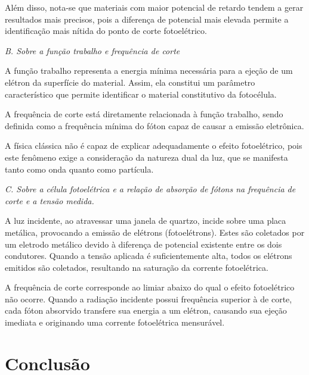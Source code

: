 \documentclass[10pt,twocolumn,letterpaper]{article}
\begin{document}
\hspace{1cm} Além disso, nota-se que materiais com maior potencial de retardo tendem a gerar resultados mais precisos, pois a diferença de potencial mais elevada permite a identificação mais nítida do ponto de corte fotoelétrico.

\noindent\textit{B. Sobre a função trabalho e frequência de corte}

\hspace{1cm} A função trabalho representa a energia mínima necessária para a ejeção de um elétron da superfície do material. Assim, ela constitui um parâmetro característico que permite identificar o material constitutivo da fotocélula.

\hspace{1cm} A frequência de corte está diretamente relacionada à função trabalho, sendo definida como a frequência mínima do fóton capaz de causar a emissão eletrônica.

\hspace{1cm} A física clássica não é capaz de explicar adequadamente o efeito fotoelétrico, pois este fenômeno exige a consideração da natureza dual da luz, que se manifesta tanto como onda quanto como partícula.

\noindent\textit{C. Sobre a célula fotoelétrica e a relação de absorção de
fótons na frequência de corte e a tensão medida.}

\hspace{1cm} A luz incidente, ao atravessar uma janela de quartzo, incide sobre uma placa metálica, provocando a emissão de elétrons (fotoelétrons). Estes são coletados por um eletrodo metálico devido à diferença de potencial existente entre os dois condutores.
Quando a tensão aplicada é suficientemente alta, todos os elétrons emitidos são coletados, resultando na saturação da corrente fotoelétrica.

\hspace{1cm} A frequência de corte corresponde ao limiar abaixo do qual o efeito fotoelétrico não ocorre. Quando a radiação incidente possui frequência superior à de corte, cada fóton absorvido transfere sua energia a um elétron, causando sua ejeção imediata e originando uma corrente fotoelétrica mensurável.


\section{Conclusão}
\end{document}
